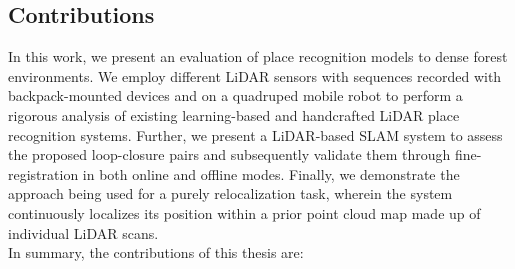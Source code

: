 

\subsection*{Contributions}

In this work, we present an evaluation of place recognition models to dense forest environments. We employ different LiDAR sensors with sequences recorded with backpack-mounted devices and on a quadruped mobile robot to perform a rigorous analysis of existing learning-based and handcrafted LiDAR place recognition systems. Further, we present a LiDAR-based SLAM system to assess the proposed loop-closure pairs and subsequently validate them through fine-registration in both online and offline modes. Finally, we demonstrate the approach being used for a purely relocalization task, wherein the system continuously localizes its position within a prior point cloud map made up of individual LiDAR scans.\\
In summary, the contributions of this thesis are:



